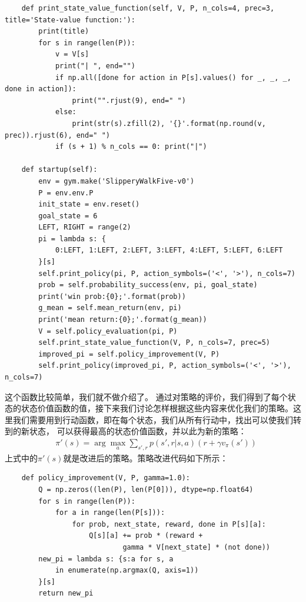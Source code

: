 \begin{lstlisting}
    def print_state_value_function(self, V, P, n_cols=4, prec=3, title='State-value function:'):
        print(title)
        for s in range(len(P)):
            v = V[s]
            print("| ", end="")
            if np.all([done for action in P[s].values() for _, _, _, done in action]):
                print("".rjust(9), end=" ")
            else:
                print(str(s).zfill(2), '{}'.format(np.round(v, prec)).rjust(6), end=" ")
            if (s + 1) % n_cols == 0: print("|")

    def startup(self):
        env = gym.make('SlipperyWalkFive-v0')
        P = env.env.P
        init_state = env.reset()
        goal_state = 6
        LEFT, RIGHT = range(2)
        pi = lambda s: {
            0:LEFT, 1:LEFT, 2:LEFT, 3:LEFT, 4:LEFT, 5:LEFT, 6:LEFT
        }[s]
        self.print_policy(pi, P, action_symbols=('<', '>'), n_cols=7)
        prob = self.probability_success(env, pi, goal_state)
        print('win prob:{0};'.format(prob))
        g_mean = self.mean_return(env, pi)
        print('mean return:{0};'.format(g_mean))
        V = self.policy_evaluation(pi, P)
        self.print_state_value_function(V, P, n_cols=7, prec=5)
        improved_pi = self.policy_improvement(V, P)
        self.print_policy(improved_pi, P, action_symbols=('<', '>'), n_cols=7)
\end{lstlisting}
这个函数比较简单，我们就不做介绍了。
通过对策略的评价，我们得到了每个状态的状态价值函数的值，接下来我们讨论怎样根据这些内容来优化我们的策略。这里我们需要用到行动函数，即在每个状态，我们从所有行动中，找出可以使我们转到的新状态，
可以获得最高的状态价值函数，并以此为新的策略：
\begin{equation}
\begin{aligned}
& \pi ' (s) = \arg \max_{a} \sum_{s',r} p(s', r | s, a)(r + \gamma v_{\pi}(s'))
\end{aligned}
\label{a-v-f-p-e-swf-demo}
\end{equation}
上式中的$\pi '(s)$就是改进后的策略。策略改进代码如下所示：
\begin{lstlisting}
    def policy_improvement(V, P, gamma=1.0):
        Q = np.zeros((len(P), len(P[0])), dtype=np.float64)
        for s in range(len(P)):
            for a in range(len(P[s])):
                for prob, next_state, reward, done in P[s][a]:
                    Q[s][a] += prob * (reward + 
                            gamma * V[next_state] * (not done))
        new_pi = lambda s: {s:a for s, a 
            in enumerate(np.argmax(Q, axis=1))
        }[s]
        return new_pi
\end{lstlisting}
